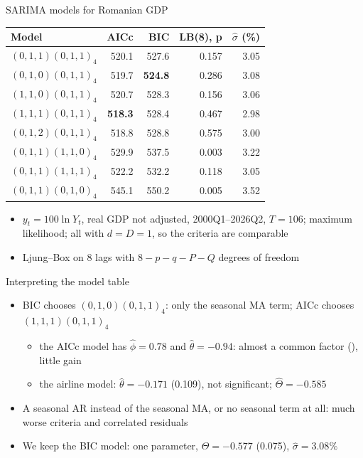 \begin{frame}{SARIMA models for Romanian GDP}
\itemsize{\footnotesize}
\begin{center}
\scriptsize
\begin{tabular}{lrrrr}
\toprule
\textbf{Model} & \textbf{AICc} & \textbf{BIC} & \textbf{LB(8), p} & $\hat\sigma$ (\%) \\
\midrule
$(0,1,1)(0,1,1)_4$ & 520.1 & 527.6 & 0.157 & 3.05 \\
$(0,1,0)(0,1,1)_4$ & 519.7 & \textbf{524.8} & 0.286 & 3.08 \\
$(1,1,0)(0,1,1)_4$ & 520.7 & 528.3 & 0.156 & 3.06 \\
$(1,1,1)(0,1,1)_4$ & \textbf{518.3} & 528.4 & 0.467 & 2.98 \\
$(0,1,2)(0,1,1)_4$ & 518.8 & 528.8 & 0.575 & 3.00 \\
$(0,1,1)(1,1,0)_4$ & 529.9 & 537.5 & 0.003 & 3.22 \\
$(0,1,1)(1,1,1)_4$ & 522.2 & 532.2 & 0.118 & 3.05 \\
$(0,1,1)(0,1,0)_4$ & 545.1 & 550.2 & 0.005 & 3.52 \\
\bottomrule
\end{tabular}
\end{center}
\begin{itemize}
    \item $y_t = 100\ln Y_t$, real GDP not adjusted, 2000Q1--2026Q2, $T = 106$; maximum likelihood; all with $d = D = 1$, so the criteria are comparable
    \item Ljung--Box on 8 lags with $8 - p - q - P - Q$ degrees of freedom
\end{itemize}
\end{frame}

\begin{frame}{Interpreting the model table}
\itemsize{\small}
\begin{itemize}
    \item BIC chooses $(0,1,0)(0,1,1)_4$: only the seasonal MA term; AICc chooses $(1,1,1)(0,1,1)_4$
    \begin{itemize}
        \item the AICc model has $\hat\phi = 0.78$ and $\hat\theta = \ensuremath{-}0.94$: almost a common factor (), little gain
        \item the airline model: $\hat\theta = \ensuremath{-}0.171$ (0.109), not significant; $\hat\Theta = \ensuremath{-}0.585$
    \end{itemize}
    \item A seasonal AR instead of the seasonal MA, or no seasonal term at all: much worse criteria and correlated residuals
    \item We keep the BIC model: one parameter, $\hat\Theta = \ensuremath{-}0.577$ (0.075), $\hat\sigma = 3.08\%$
\end{itemize}
\end{frame}

